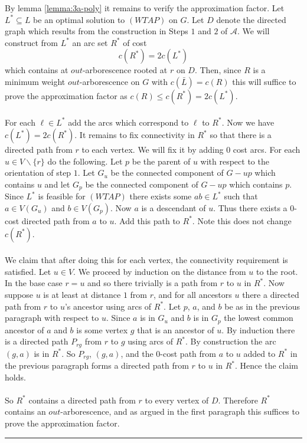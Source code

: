 \documentclass[letterpaper,12pt,oneside,onecolumn]{article}
\newcommand{\cA}{\mathcal{A}} \newcommand{\cB}{\mathcal{B}}
\newenvironment{proof}{{\bf Proof:  }}{\hfill\rule{2mm}{2mm}}
\begin{document}
\begin{proof}
By lemma \ref{lemma:3a-poly} it remains to verify the approximation factor. Let $L^* \subseteq L$ be an optimal solution to $(WTAP)$ on $G$. Let $D$ denote the directed graph which results from the construction in Steps $1$ and $2$ of $\cA$. We will construct from $L^*$ an arc set $R^*$ of cost
$$c(R^*)=2c(L^*)$$
which contains at $out$-arborescence rooted at $r$ on $D$.
Then, since $R$ is a minimum weight $out$-arborescence on $G$ with $c(\bar{L}) = c(R)$ this will suffice to prove the approximation factor as $c(R) \leq c(R^*) = 2c(L^*)$.
\paragraph{}
For each $\ell \in L^*$ add the arcs which correspond to $\ell$ to $R^*$. Now we have $c(L^*) = 2c(R^*)$. It remains to fix connectivity in $R^*$ so that there is a directed path from $r$ to each vertex. We will fix it by adding $0$ cost arcs. For each $u \in V\backslash \{r\}$ do the following. Let $p$ be the parent of $u$ with respect to the orientation of step $1$.  Let $G_u$ be the connected component of $G-up$ which contains $u$ and let $G_p$ be the connected component of $G-up$ which contains $p$. Since $L^*$ is feasible for $(WTAP)$ there exists some $ab \in L^*$ such that $a \in V(G_u)$ and $b \in V(G_p)$. Now $a$ is a descendant of $u$. Thus there exists a $0$-cost directed path from $a$ to $u$. Add this path to $R^*$. Note this does not change $c(R^*)$.
\paragraph{}
We claim that after doing this for each vertex, the connectivity requirement is satisfied. Let $u \in V$. We proceed by induction on the distance from $u$ to the root. In the base case $r=u$ and so there trivially is a path from $r$ to $u$ in $R^*$. Now suppose $u$ is at least at distance $1$ from $r$, and for all ancestors $u$ there a directed path from $r$ to $u$'s ancestor using arcs of $R^*$. Let $p$, $a$, and $b$ be as in the previous paragraph with respect to $u$. Since $a$ is in $G_u$ and $b$ is in $G_p$ the lowest common ancestor of $a$ and $b$ is some vertex $g$ that is an ancestor of $u$. By induction there is a directed path $P_{rg}$ from $r$ to $g$ using arcs of $R^*$. By construction the arc $(g,a)$ is in $R^*$. So $P_{rg}$, $(g,a)$, and the $0$-cost path from $a$ to $u$ added to $R^*$ in the previous paragraph forms a directed path from $r$ to $u$ in $R^*$. Hence the claim holds. 
\paragraph{}
So $R^*$ contains a directed path from $r$ to every vertex of $D$. Therefore $R^*$ contains an $out$-arborescence, and as argued in the first paragraph this suffices to prove the approximation factor.
\end{proof}
\end{document}
